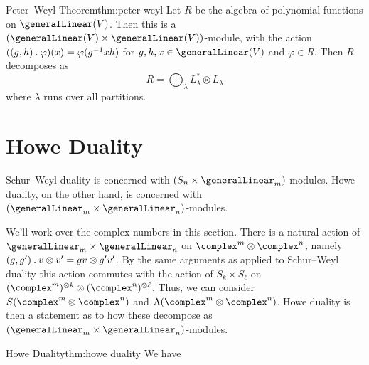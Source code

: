 \begin{thm}{Peter--Weyl Theorem}{thm:peter-weyl}
    Let \(R\) be the algebra of polynomial functions on \(\generalLinear(V)\).
    Then this is a \((\generalLinear(V) \times \generalLinear(V))\)-module, with the action \(((g, h) \mathbin{.} \varphi)(x) = \varphi(g^{-1}xh)\) for \(g, h, x \in \generalLinear(V)\) and \(\varphi \in R\).
    Then \(R\) decomposes as
    \begin{equation}
        R = \bigoplus_{\lambda} L_\lambda^* \otimes L_\lambda
    \end{equation}
    where \(\lambda\) runs over all partitions.
\end{thm}

\section{Howe Duality}
Schur--Weyl duality is concerned with \((S_n \times \generalLinear_m)\)-modules.
Howe duality, on the other hand, is concerned with \((\generalLinear_m \times \generalLinear_n)\)-modules.

We'll work over the complex numbers in this section.
There is a natural action of \(\generalLinear_m \times \generalLinear_n\) on \(\complex^m \otimes \complex^n\), namely \((g, g') \mathbin{.} v \otimes v' = gv \otimes g'v'\).
By the same arguments as applied to Schur--Weyl duality this action commutes with the action of \(S_k \times S_\ell\) on \((\complex^m)^{\otimes k} \otimes (\complex^n)^{\otimes \ell}\).
Thus, we can consider \(S(\complex^m \otimes \complex^n)\) and \(\Lambda(\complex^m \otimes \complex^n)\).
Howe duality is then a statement as to how these decompose as \((\generalLinear_m \times \generalLinear_n)\)-modules.

\begin{thm}{Howe Duality}{thm:howe duality}
    We have
\end{thm}

